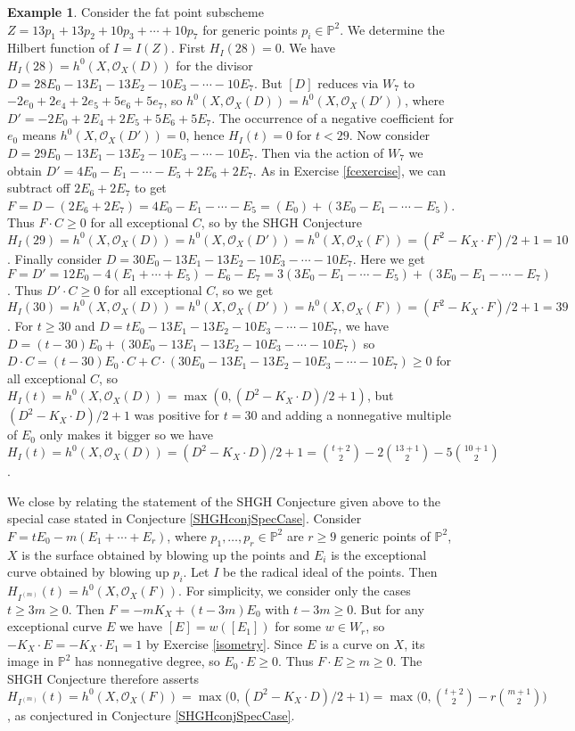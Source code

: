 \documentclass[11pt,twoside]{amsart}
\numberwithin{equation}{section}
\theoremstyle{definition}
\newtheorem{example}[theorem]{Example}
\begin{document}
\begin{example}
Consider the fat point subscheme $Z=13p_1+13p_2+10p_3+\cdots+10p_7$ for generic points $p_i\in{\mathbb{P}^{2}}$.
We determine the Hilbert function of $I=I(Z)$.
First $H_I(28)=0$. We have $H_I(28)=h^0(X,{{\mathcal O}}_X(D))$ for
the divisor $D=28E_0-13E_1-13E_2-10E_3-\cdots-10E_7$.
But $[D]$ reduces via $W_7$ to $-2e_0+2e_4+2e_5+5e_6+5e_7$, so
$h^0(X,{{\mathcal O}}_X(D))=h^0(X,{{\mathcal O}}_X(D'))$, where $D'=-2E_0+2E_4+2E_5+5E_6+5E_7$.
The occurrence of a negative coefficient for $e_0$ means $h^0(X,{{\mathcal O}}_X(D'))=0$,
hence $H_I(t)=0$ for $t<29$.
Now consider $D=29E_0-13E_1-13E_2-10E_3-\cdots-10E_7$.
Then via the action of $W_7$ we obtain $D'=4E_0-E_1-\cdots-E_5+2E_6+2E_7$.
As in Exercise \ref{fcexercise}, we can subtract off $2E_6+2E_7$ to get
$F=D-(2E_6+2E_7)=4E_0-E_1-\cdots-E_5=(E_0)+(3E_0-E_1-\cdots-E_5)$. 
Thus $F\cdot C\geq 0$ for all exceptional $C$, so by the SHGH Conjecture
$H_I(29)=h^0(X,{{\mathcal O}}_X(D))=h^0(X,{{\mathcal O}}_X(D'))=h^0(X,{{\mathcal O}}_X(F))=(F^2-K_X\cdot F)/2 +1=10$.
Finally consider $D=30E_0-13E_1-13E_2-10E_3-\cdots-10E_7$.
Here we get $F=D'=12E_0-4(E_1+\cdots+E_5)-E_6-E_7=3(3E_0-E_1-\cdots-E_5)+(3E_0-E_1-\cdots-E_7)$.
Thus $D'\cdot C\geq 0$ for all exceptional $C$, so we get
$H_I(30)=h^0(X,{{\mathcal O}}_X(D))=h^0(X,{{\mathcal O}}_X(D'))=h^0(X,{{\mathcal O}}_X(F))=(F^2-K_X\cdot F)/2 +1=39$.
For $t\geq 30$ and $D=tE_0-13E_1-13E_2-10E_3-\cdots-10E_7$, we have 
$D=(t-30)E_0+(30E_0-13E_1-13E_2-10E_3-\cdots-10E_7)$ so
$D\cdot C=(t-30)E_0\cdot C+C\cdot (30E_0-13E_1-13E_2-10E_3-\cdots-10E_7)\geq 0$
for all exceptional $C$, so 
$H_I(t)=h^0(X,{{\mathcal O}}_X(D))=\max(0,(D^2-K_X\cdot D)/2 +1)$,
but $(D^2-K_X\cdot D)/2 +1$ was positive for $t=30$ and adding a nonnegative 
multiple of $E_0$ only makes it bigger so we have
$H_I(t)=h^0(X,{{\mathcal O}}_X(D))=(D^2-K_X\cdot D)/2 +1=\binom{t+2}{2}-2\binom{13+1}{2}-5\binom{10+1}{2}$.
\end{example}

We close by relating the statement of the SHGH Conjecture given above
to the special case stated in Conjecture \ref{SHGHconjSpecCase}.
Consider $F=tE_0-m(E_1+\cdots+E_r)$, where $p_1,\ldots,p_r\in{\mathbb{P}^{2}}$ are $r\geq9$ 
generic points of ${\mathbb{P}^{2}}$, $X$ is the surface obtained by blowing up the points and $E_i$
is the exceptional curve obtained by blowing up $p_i$.
Let $I$ be the radical ideal of the points. 
Then $H_{I^{(m)}}(t)=h^0(X,{{\mathcal O}}_X(F))$.
For simplicity, we consider only the cases $t\geq 3m\geq0$.
Then $F=-mK_X+(t-3m)E_0$ with $t-3m\geq0$. But for any exceptional curve $E$ we have
$[E]=w([E_1])$ for some $w\in W_r$, so $-K_X\cdot E=-K_X\cdot E_1=1$
by Exercise \ref{isometry}. Since $E$ is a curve on $X$, its image in
${\mathbb{P}^{2}}$ has nonnegative degree, so $E_0\cdot E\geq 0$.
Thus $F\cdot E\geq m\geq0$. The SHGH Conjecture therefore asserts
$H_{I^{(m)}}(t)=h^0(X,{{\mathcal O}}_X(F))=\max\big(0,(D^2-K_X\cdot D)/2+1\big)=
\max\Big(0,\binom{t+2}{2}-r\binom{m+1}{2}\Big)$,
as conjectured in Conjecture \ref{SHGHconjSpecCase}.
\end{document}
